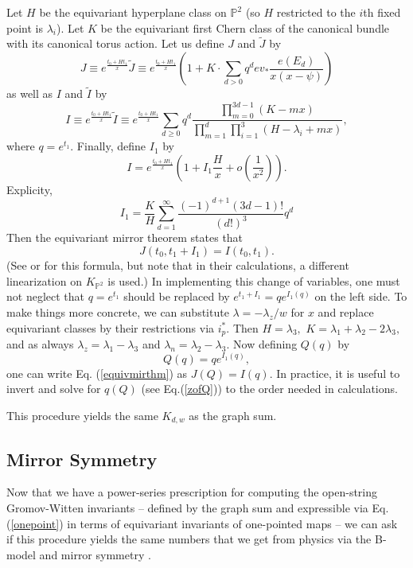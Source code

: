 \documentclass[a4paper,11pt]{article}
\newcommand{\PP}{{\mathbb{P}}}
\begin{document}
Let $H$ be the equivariant hyperplane class on
$\PP^2$ (so $H$ restricted to the $i$th fixed point
is $\lambda_i$).  Let $K$ be the equivariant first
Chern class of the canonical bundle with
its canonical torus action.  Let us define $J$
and $\widetilde{J}$ by
$$
J\equiv e^{\frac{t_0 + H t_1}{x}} \widetilde{J}
\equiv e^{\frac{t_0 + H t_1}{x}}  (1 + K \cdot \sum_{d>0} q^d 
ev_*\frac{e(E_d)}{x(x-\psi)})
$$
as well as $I$ and $\widetilde{I}$ by
\begin{equation}
\label{Jeq}
I \equiv e^{\frac{t_0 + H t_1}{x}} \widetilde{I}
\equiv e^\frac{t_0 + H t_1}{x} 
\sum_{d\geq 0} q^d \frac{\prod_{m=0}^{3d-1}(K - mx)}
{\prod_{m=1}^{d} \prod_{i=1}^{3} (H-\lambda_i +mx)},
\end{equation}
where $q = e^{t_1}.$
Finally, define $I_1$ by
\begin{equation}
\label{Ieq}
I=  e^\frac{t_0 + H t_1}{x}(1+I_1 \frac{H}{x} + o(\frac{1}{x^2})).
\end{equation}
Explicity, 
$$
I_1=\frac{K}{H} \sum_{d=1}^\infty \frac{(-1)^{d+1}(3d-1)!}{(d!)^3}q^d
$$
Then the equivariant mirror theorem states that
\begin{equation}
\label{equivmirthm}
J(t_0, t_1 + I_1) = I(t_0,t_1).
\end{equation}
(See \cite{E} or \cite{LLY} for this formula, but note that in
their calculations, a different linearization on $K_{\PP^2}$
is used.)
In implementing this change of variables,
one must not neglect that $q=e^{t_1}$
should be replaced by $e^{t_1+I_1} = qe^{I_1(q)}$
on the left side.
To make things more concrete, we can substitute
$\lambda = -\lambda_z/w$ for $x$ and replace
equivariant classes by their restrictions via $i_p^*.$
Then $H = \lambda_3,$ $K = \lambda_1 + \lambda_2
-2\lambda_3,$ and as always $\lambda_z = \lambda_1-
\lambda_3$ and $\lambda_n = \lambda_2 - \lambda_3.$
Now defining $Q(q)$ by $$Q(q) = qe^{I_1(q)},$$
one can write Eq. \!(\ref{equivmirthm})
as $J(Q) = I(q).$  In practice, it is useful
to invert and solve for $q(Q)$ (see Eq.\!({\ref{zofQ}}))
to the order
needed in calculations.

This procedure yields the same $K_{d,w}$ as the
graph sum.

\subsection{Mirror Symmetry}

Now that we have a power-series prescription for computing
the open-string Gromov-Witten invariants -- defined by the
graph sum and expressible via Eq. \!\!(\ref{onepoint})
in terms of equivariant invariants of
one-pointed maps -- we can ask if this procedure yields
the same numbers that we get from physics
via the B-model and mirror symmetry \cite{AV} \cite{AKV}.
\end{document}

